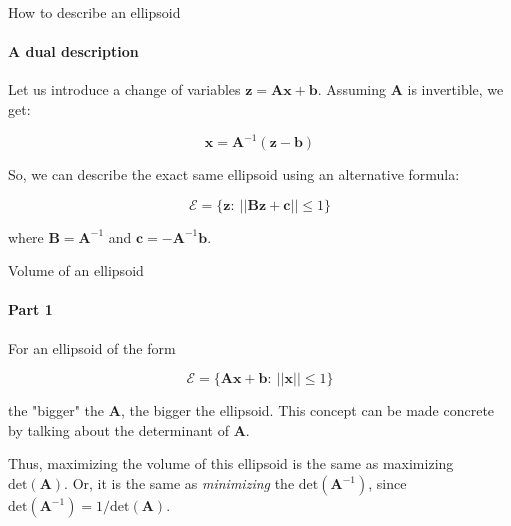 \documentclass{beamer}
\begin{document}
\begin{frame}{How to describe an ellipsoid}
\framesubtitle{A dual description}
\begin{flushleft}

Let us introduce a change of variables $\mathbf{z} = \mathbf{A}\mathbf{x} + \mathbf{b}$. Assuming $\mathbf{A}$ is invertible, we get:

\begin{equation}
    \mathbf{x} = \mathbf{A}^{-1}(\mathbf{z} - \mathbf{b})
\end{equation}

So, we can describe the exact same ellipsoid using an alternative formula: 

\begin{equation}
    \mathcal{E} = \{ \mathbf{z}: \ || \mathbf{B}\mathbf{z} + \mathbf{c} || \leq 1 \}
\end{equation}
 
 where $\mathbf{B} = \mathbf{A}^{-1}$ and $\mathbf{c} = -\mathbf{A}^{-1}\mathbf{b}$.
 
\end{flushleft}
\end{frame}



\begin{frame}{Volume of an ellipsoid}
\framesubtitle{Part 1}
\begin{flushleft}

For an ellipsoid of the form

\begin{equation}
    \mathcal{E} = \{ \mathbf{A}\mathbf{x} + \mathbf{b}: \ || \mathbf{x} || \leq 1 \}
\end{equation}

the "bigger" the $\mathbf{A}$, the bigger the ellipsoid. This concept can be made concrete by talking about the determinant of $\mathbf{A}$.

\bigskip

Thus, maximizing the volume of this ellipsoid is the same as maximizing $\text{det}(\mathbf{A})$. Or, it is the same as \emph{minimizing} the $\text{det}(\mathbf{A}^{-1})$, since $\text{det}(\mathbf{A}^{-1}) = 1 / \text{det}(\mathbf{A})$.
 
\end{flushleft}
\end{frame}
\end{document}

